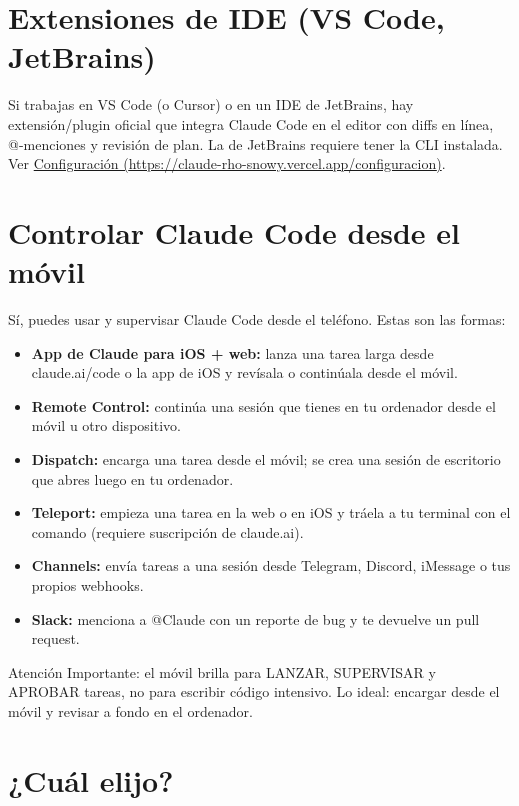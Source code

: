 \documentclass[11pt,a4paper]{report}
\DeclareRobustCommand{\texttt}[1]{{\ttfamily\seqsplit{#1}}}
\begin{document}
\section{ Extensiones de IDE (VS Code, JetBrains)}

Si trabajas en VS Code (o Cursor) o en un IDE de JetBrains, hay extensión/plugin oficial que integra Claude Code en el editor con diffs en línea, @-menciones y revisión de plan. La de JetBrains requiere tener la CLI instalada. Ver \href{https://claude-rho-snowy.vercel.app/configuracion}{Configuración (\url{https://claude-rho-snowy.vercel.app/configuracion})}.

\section{ Controlar Claude Code desde el móvil}

Sí, puedes usar y supervisar Claude Code desde el teléfono. Estas son las formas:

\begin{itemize}
\item \textbf{App de Claude para iOS + web:} lanza una tarea larga desde claude.ai/code o la app de iOS y revísala o continúala desde el móvil.
\item \textbf{Remote Control:} continúa una sesión que tienes en tu ordenador desde el móvil u otro dispositivo.
\item \textbf{Dispatch:} encarga una tarea desde el móvil; se crea una sesión de escritorio que abres luego en tu ordenador.
\item \textbf{Teleport:} empieza una tarea en la web o en iOS y tráela a tu terminal con el comando \texttt{claude --teleport} (requiere suscripción de claude.ai).
\item \textbf{Channels:} envía tareas a una sesión desde Telegram, Discord, iMessage o tus propios webhooks.
\item \textbf{Slack:} menciona a @Claude con un reporte de bug y te devuelve un pull request.
\end{itemize}

\begin{calloutbox}{Atención}
Importante: el móvil brilla para LANZAR, SUPERVISAR y APROBAR tareas, no para escribir código intensivo. Lo ideal: encargar desde el móvil y revisar a fondo en el ordenador.\end{calloutbox}

\section{¿Cuál elijo?}
\end{document}
